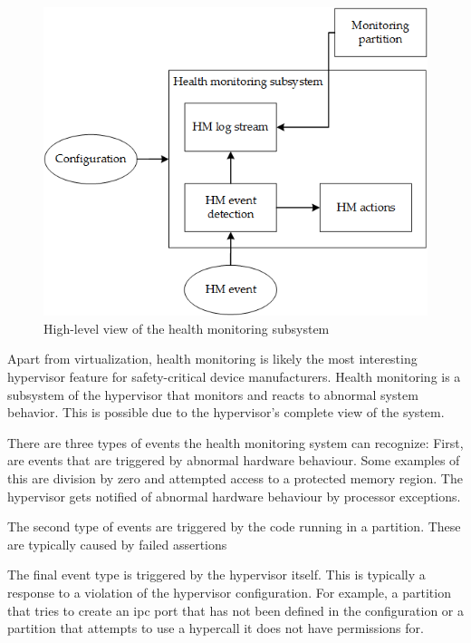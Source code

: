 \begin{figure}[hb!]
\centering
\includegraphics[scale=0.50]{Figures/health_monitoring.png}
\decoRule
\caption{High-level view of the health monitoring subsystem}
\label{fig:health_monitoring}
\end{figure}
Apart from virtualization, health monitoring is likely the most interesting hypervisor feature for safety-critical device manufacturers. Health monitoring is a subsystem of the hypervisor that monitors and reacts to abnormal system behavior. This is possible due to the hypervisor's complete view of the system.

There are three types of events the health monitoring system can recognize: First, are events that are triggered by abnormal hardware behaviour. Some examples of this are division by zero and attempted access to a protected memory region. The hypervisor gets notified of abnormal hardware behaviour by processor exceptions.

The second type of events are triggered by the code running in a partition. These are typically caused by failed assertions 

The final event type is triggered by the hypervisor itself. This is typically a response to a violation of the hypervisor configuration. For example, a partition that tries to create an \acrshort{ipc} port that has not been defined in the configuration or a partition that attempts to use a hypercall it does not have permissions for.

